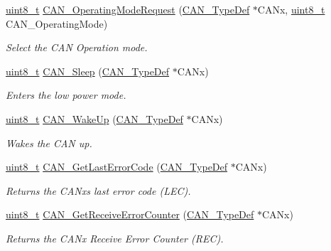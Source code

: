 \begin{DoxyCompactItemize}
\hyperlink{_p_e___types_8h_aba7bc1797add20fe3efdf37ced1182c5}{uint8\+\_\+t} \hyperlink{group___c_a_n___exported___functions_gab2a3630e9e3024114eb117d14e514208}{C\+A\+N\+\_\+\+Operating\+Mode\+Request} (\hyperlink{struct_c_a_n___type_def}{C\+A\+N\+\_\+\+Type\+Def} $\ast$C\+A\+Nx, \hyperlink{_p_e___types_8h_aba7bc1797add20fe3efdf37ced1182c5}{uint8\+\_\+t} C\+A\+N\+\_\+\+Operating\+Mode)
\begin{DoxyCompactList}\small\item\em Select the C\+AN Operation mode. \end{DoxyCompactList}\item 
\hyperlink{_p_e___types_8h_aba7bc1797add20fe3efdf37ced1182c5}{uint8\+\_\+t} \hyperlink{group___c_a_n___exported___functions_ga640215e38765759d7eceb8a039046667}{C\+A\+N\+\_\+\+Sleep} (\hyperlink{struct_c_a_n___type_def}{C\+A\+N\+\_\+\+Type\+Def} $\ast$C\+A\+Nx)
\begin{DoxyCompactList}\small\item\em Enters the low power mode. \end{DoxyCompactList}\item 
\hyperlink{_p_e___types_8h_aba7bc1797add20fe3efdf37ced1182c5}{uint8\+\_\+t} \hyperlink{group___c_a_n___exported___functions_ga78cdfbf1884b9e33c552bcbca15bed10}{C\+A\+N\+\_\+\+Wake\+Up} (\hyperlink{struct_c_a_n___type_def}{C\+A\+N\+\_\+\+Type\+Def} $\ast$C\+A\+Nx)
\begin{DoxyCompactList}\small\item\em Wakes the C\+AN up. \end{DoxyCompactList}\item 
\hyperlink{_p_e___types_8h_aba7bc1797add20fe3efdf37ced1182c5}{uint8\+\_\+t} \hyperlink{group___c_a_n___exported___functions_gaaee721a392b6b21bfd15dc160aeb6924}{C\+A\+N\+\_\+\+Get\+Last\+Error\+Code} (\hyperlink{struct_c_a_n___type_def}{C\+A\+N\+\_\+\+Type\+Def} $\ast$C\+A\+Nx)
\begin{DoxyCompactList}\small\item\em Returns the C\+A\+Nx\textquotesingle{}s last error code (L\+EC). \end{DoxyCompactList}\item 
\hyperlink{_p_e___types_8h_aba7bc1797add20fe3efdf37ced1182c5}{uint8\+\_\+t} \hyperlink{group___c_a_n___exported___functions_ga6903eecbec40eb1361d915ddde9a3274}{C\+A\+N\+\_\+\+Get\+Receive\+Error\+Counter} (\hyperlink{struct_c_a_n___type_def}{C\+A\+N\+\_\+\+Type\+Def} $\ast$C\+A\+Nx)
\begin{DoxyCompactList}\small\item\em Returns the C\+A\+Nx Receive Error Counter (R\+EC). \end{DoxyCompactList}\item 

\end{DoxyCompactItemize}
